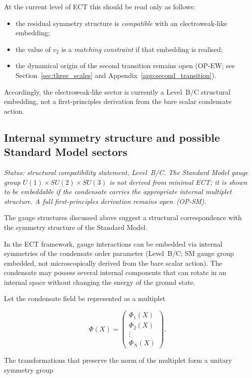 \documentclass[11pt,a4paper]{article}
\numberwithin{equation}{section}
\begin{document}
At the current level of ECT this should be read only as follows:
\begin{itemize}
  \item the residual symmetry structure is \emph{compatible} with an
    electroweak-like embedding;
  \item the value of $v_2$ is a \emph{matching constraint} if that
    embedding is realised;
  \item the dynamical origin of the second transition remains open
    (OP-EW; see Section~\ref{sec:three_scales} and
    Appendix~\ref{app:second_transition}).
\end{itemize}
Accordingly, the electroweak-like sector is currently a
Level~B/C structural embedding, not a first-principles derivation from
the bare scalar condensate action.

\subsection{Internal symmetry structure and possible Standard Model sectors}

\textit{Status: structural compatibility statement, Level~B/C.
The Standard Model gauge group $U(1)\times SU(2)\times SU(3)$
is not derived from minimal ECT; it is shown to be embeddable
if the condensate carries the appropriate internal multiplet structure.
A full first-principles derivation remains open~(OP-SM).}

The gauge structures discussed above suggest a structural correspondence
with the symmetry structure of the Standard Model.

In the ECT framework, gauge interactions can be embedded via internal
symmetries of the condensate order parameter (Level~B/C; SM gauge group
embedded, not microscopically derived from the bare scalar action).
The condensate may possess several internal components that can
rotate in an internal space without changing the energy of the ground state.

Let the condensate field be represented as a multiplet

\begin{equation}
\Phi(X)=
\begin{pmatrix}
\Phi_1(X) \\
\Phi_2(X) \\
\vdots \\
\Phi_N(X)
\end{pmatrix}.
\end{equation}

The transformations that preserve the norm of the multiplet form a
unitary symmetry group
\end{document}
